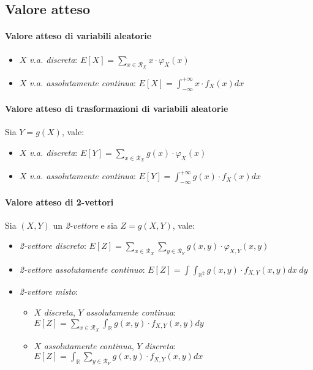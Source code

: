 \documentclass[12pt, a4paper]{report}
\theoremstyle{definition}
\begin{document}
\subsection{Valore atteso}
\paragraph{Valore atteso di variabili aleatorie}
\begin{itemize}
    \item $X$ \emph{v.a. discreta}: $E[X]=\sum_{x\in\mathcal{R}_X}x\cdot\varphi_X(x)$
    \item $X$ \emph{v.a. assolutamente continua}: $E[X]=\int_{-\infty}^{+\infty}x
    \cdot f_X(x)dx$
\end{itemize}

\paragraph{Valore atteso di trasformazioni di variabili aleatorie}
Sia $Y=g(X)$, vale:
\begin{itemize}
    \item $X$ \emph{v.a. discreta}: $E[Y]=\sum_{x\in\mathcal{R}_X}g(x)\cdot\varphi_X(x)$
    \item $X$ \emph{v.a. assolutamente continua}: $E[Y]=\int_{-\infty}^{+\infty}
    g(x)\cdot f_X(x)dx$
\end{itemize}

\paragraph{Valore atteso di 2-vettori}
Sia $(X,Y)$ un \emph{2-vettore} e sia $Z=g(X,Y)$, vale:
\begin{itemize}
    \item \emph{2-vettore discreto}: $E[Z]=\sum_{x\in\mathcal{R}_X}\sum_
    {y\in\mathcal{R}_Y}g(x,y)\cdot\varphi_{X,Y}(x,y)$
    \item \emph{2-vettore assolutamente continuo}: $E[Z]=\int\int_{\mathbb{R}^2}
    g(x,y)\cdot f_{X,Y}(x,y)dx\ dy$
    \item \emph{2-vettore misto}:
    \begin{itemize}
        \item $X$ \emph{discreta}, $Y$ \emph{assolutamente continua}:
        $E[Z]=\sum_{x\in\mathcal{R}_X}\int_{\mathbb{R}}g(x,y)\cdot f_{X,Y}(x,y)dy$
        \item $X$ \emph{assolutamente continua}, $Y$ \emph{discreta}:
        $E[Z]=\int_{\mathbb{R}}\sum_{y\in\mathcal{R}_Y}g(x,y)\cdot f_{X,Y}(x,y)dx$
    \end{itemize}
\end{itemize}
\end{document}
